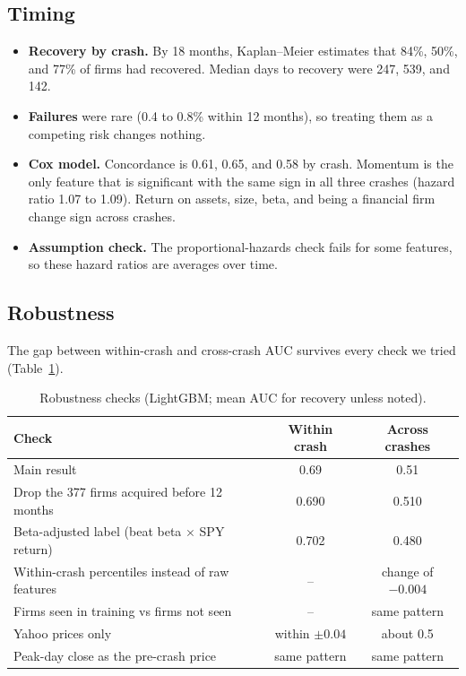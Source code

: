 \documentclass[11pt]{article}
\begin{document}
\subsection{Timing}
\begin{itemize}
  \item \textbf{Recovery by crash.} By 18 months, Kaplan--Meier estimates that 84\%, 50\%, and 77\% of firms had recovered. Median days to recovery were 247, 539, and 142.
  \item \textbf{Failures} were rare (0.4 to 0.8\% within 12 months), so treating them as a competing risk changes nothing.
  \item \textbf{Cox model.} Concordance is 0.61, 0.65, and 0.58 by crash. Momentum is the only feature that is significant with the same sign in all three crashes (hazard ratio 1.07 to 1.09). Return on assets, size, beta, and being a financial firm change sign across crashes.
  \item \textbf{Assumption check.} The proportional-hazards check fails for some features, so these hazard ratios are averages over time.
\end{itemize}

\subsection{Robustness}
The gap between within-crash and cross-crash AUC survives every check we tried (Table~\ref{tab:robust}).

\begin{table}[h]
\centering\small
\caption{Robustness checks (LightGBM; mean AUC for recovery unless noted).}
\label{tab:robust}
\begin{tabularx}{\textwidth}{Xcc}
\toprule
Check & Within crash & Across crashes \\
\midrule
Main result & 0.69 & 0.51 \\
Drop the 377 firms acquired before 12 months & 0.690 & 0.510 \\
Beta-adjusted label (beat beta $\times$ SPY return) & 0.702 & 0.480 \\
Within-crash percentiles instead of raw features & -- & change of $-0.004$ \\
Firms seen in training vs firms not seen & -- & same pattern \\
Yahoo prices only & within $\pm 0.04$ & about 0.5 \\
Peak-day close as the pre-crash price & same pattern & same pattern \\
\bottomrule
\end{tabularx}
\end{table}
\end{document}
